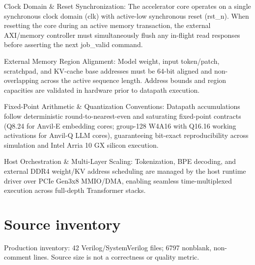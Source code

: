 \documentclass[11pt,a4paper]{article}
\begin{document}
Clock Domain \& Reset Synchronization: The accelerator core operates on a single synchronous clock domain (\allowbreak{}clk)\allowbreak{} with active-low synchronous reset (\allowbreak{}rst\_\allowbreak{}n)\allowbreak{}. When resetting the core during an active memory transaction,\allowbreak{} the external AXI/\allowbreak{}memory controller must simultaneously flush any in-flight read responses before asserting the next job\_\allowbreak{}valid command.


External Memory Region Alignment: Model weight,\allowbreak{} input token/\allowbreak{}patch,\allowbreak{} scratchpad,\allowbreak{} and KV-cache base addresses must be 64-bit aligned and non-overlapping across the active sequence length. Address bounds and region capacities are validated in hardware prior to datapath execution.


Fixed-Point Arithmetic \& Quantization Conventions: Datapath accumulations follow deterministic round-to-nearest-even and saturating fixed-point contracts (\allowbreak{}Q8.24 for Anvil-E embedding cores; group-128 W4A16 with Q16.16 working activations for Anvil-Q LLM cores)\allowbreak{},\allowbreak{} guaranteeing bit-exact reproducibility across simulation and Intel Arria 10 GX silicon execution.


Host Orchestration \& Multi-Layer Scaling: Tokenization,\allowbreak{} BPE decoding,\allowbreak{} and external DDR4 weight/\allowbreak{}KV address scheduling are managed by the host runtime driver over PCIe Gen3x8 MMIO/\allowbreak{}DMA,\allowbreak{} enabling seamless time-multiplexed execution across full-depth Transformer stacks.


\appendix{}\section{Source inventory}

Production inventory: 42 Verilog/\allowbreak{}SystemVerilog files; 6797 nonblank,\allowbreak{} non-comment lines. Source size is not a correctness or quality metric.
\end{document}
